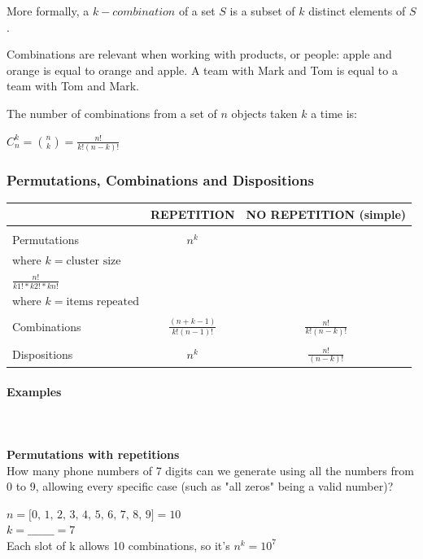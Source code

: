 \documentclass{article}
\begin{document}
More formally, a $k-combination$ of a set $S$ is a subset of $k$ distinct elements of $S$.

Combinations are relevant when working with products, or people: apple and orange is equal to orange and apple. A team with Mark and Tom is equal to a team with Tom and Mark.

The number of combinations from a set of $n$ objects taken $k$ a time is:

$\displaystyle C _n ^k = \binom{n}{k} = \frac{n!}{k!(n - k)!}$

\subsubsection{Permutations, Combinations and Dispositions}
\begin{center}
\begin{tabular}{|m{2cm}|c|c|}
\hline
& REPETITION & NO REPETITION (simple) \\ \hline
&&\\[-1em]
Permutations & $\displaystyle n^k$ & \makecell{$\displaystyle \frac{n!}{(n - k)!}$ \\[15pt] where $k = \text{cluster size}$ \\[15pt] $\displaystyle \frac{n!}{k1! * k2! * kn!}$ \\[15pt] where $k = \text{items repeated}$} \\[50pt] \hline
&&\\[-1em]
Combinations & $\displaystyle \frac{(n + k - 1)}{k!(n - 1)!}$ & $\displaystyle \frac{n!}{k!(n - k)!}$ \\[25pt] \hline
&&\\[-1em]
Dispositions & $\displaystyle n^k$ & $\displaystyle \frac{n!}{(n - k)!}$ \\[25pt] 
\hline
\end{tabular}
\end{center}

\paragraph{Examples}\mbox{} \\
\mbox{} \\
\textbf{Permutations with repetitions} \\ 
How many phone numbers of 7 digits can we generate using all the numbers from 0 to 9, allowing every specific case (such as "all zeros" being a valid number)?

$n = \text{[0, 1, 2, 3, 4, 5, 6, 7, 8, 9]} = 10$ \\
$k = \_ \_ \_ \_ \_ \_ \_ = 7$ \\ 
Each slot of k allows 10 combinations, so it’s $n^k = 10^7$
\end{document}
